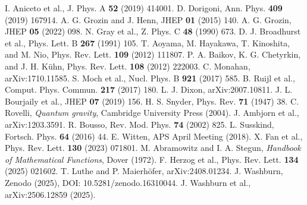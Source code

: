 \documentclass[11pt,a4paper]{article}
\theoremstyle{definition}
\theoremstyle{remark}
\begin{document}
\begin{thebibliography}{99}
 I. Aniceto et al., J. Phys. A \textbf{52} (2019) 414001.
 D. Dorigoni, Ann. Phys. \textbf{409} (2019) 167914.
 A. G. Grozin and J. Henn, JHEP \textbf{01} (2015) 140.
 A. G. Grozin, JHEP \textbf{05} (2022) 098.
 N. Gray et al., Z. Phys. C \textbf{48} (1990) 673.
 D. J. Broadhurst et al., Phys. Lett. B \textbf{267} (1991) 105.
 T. Aoyama, M. Hayakawa, T. Kinoshita, and M. Nio, Phys. Rev. Lett. \textbf{109} (2012) 111807.
 P. A. Baikov, K. G. Chetyrkin, and J. H. Kühn, Phys. Rev. Lett. \textbf{108} (2012) 222003.
 C. Monahan, arXiv:1710.11585.
 S. Moch et al., Nucl. Phys. B \textbf{921} (2017) 585.
 B. Ruijl et al., Comput. Phys. Commun. \textbf{217} (2017) 180.
 L. J. Dixon, arXiv:2007.10811.
 J. L. Bourjaily et al., JHEP \textbf{07} (2019) 156.
 H. S. Snyder, Phys. Rev. \textbf{71} (1947) 38.
 C. Rovelli, \emph{Quantum gravity}, Cambridge University Press (2004).
 J. Ambjorn et al., arXiv:1203.3591.
 R. Bousso, Rev. Mod. Phys. \textbf{74} (2002) 825.
 L. Susskind, Fortsch. Phys. \textbf{64} (2016) 44.
 E. Witten, APS April Meeting (2018).
 X. Fan et al., Phys. Rev. Lett. \textbf{130} (2023) 071801.
 M. Abramowitz and I. A. Stegun, \emph{Handbook of Mathematical Functions}, Dover (1972).
 F. Herzog et al., Phys. Rev. Lett. \textbf{134} (2025) 021602.
 T. Luthe and P. Maierhöfer, arXiv:2408.01234.
 J. Washburn, Zenodo (2025), DOI: 10.5281/zenodo.16310044.
 J. Washburn et al., arXiv:2506.12859 (2025).

\end{thebibliography}
\end{document}
